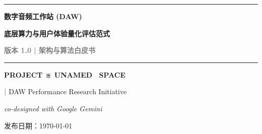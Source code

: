 \documentclass[11pt, a4paper]{article}
\begin{document}
\begin{titlepage}
    \vspace*{3cm}
    \noindent
    \rule{\textwidth}{2pt} %
    \vspace{1cm}
    
    \noindent
    {\fontsize{28pt}{34pt}\sffamily\bfseries 数字音频工作站 (DAW)\par}
    \vspace{0.5cm}
    \noindent
    {\fontsize{28pt}{34pt}\sffamily\bfseries 底层算力与用户体验量化评估范式\par}
    
    \vspace{1.5cm}
    \noindent
    {\Large\sffamily\bfseries \textcolor{gray}{版本 1.0 | 架构与算法白皮书}}\par
    
    \vspace{1cm}
    \noindent
    \rule{\textwidth}{0.5pt} %
    
    \vfill
    
    \noindent
    {\fontsize{18pt}{22pt}\agencyfont\bfseries PROJECT {\sffamily ※} UNAMED \textbullet\ SPACE}\par
    
    \noindent
    {\large\sffamily \textcolor{gray}{\textbf{|}} \quad DAW Performance Research Initiative}\par
    \vspace{0.8cm}
    
    \noindent
    {\large\sffamily \textit{co-designed with Google Gemini}}\par
    \vspace{0.3cm}

    \noindent
    {\large\sffamily 发布日期：\today}\par
    \vspace{1.5cm}
\end{titlepage}

\setcounter{page}{1} %
\tableofcontents
\clearpage
\end{document}
